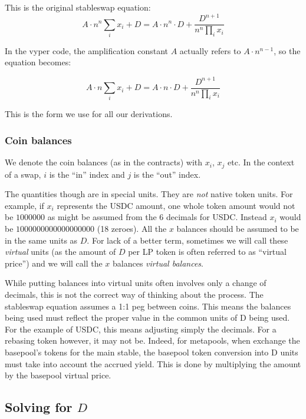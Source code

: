 \documentclass[
]{article}
\begin{document}
This is the original stableswap equation:
\[ A \cdot n^n  \sum_i x_i + D = A \cdot n^n \cdot D + \frac{D^{n+1}}{n^n \prod_i x_i}\]

In the vyper code, the amplification constant \(A\) actually refers to
\(A \cdot n^{n-1}\), so the equation becomes:

\[ A \cdot n  \sum_i x_i + D = A \cdot n \cdot D + \frac{D^{n+1}}{n^n \prod_i x_i}\]

This is the form we use for all our derivations.

\hypertarget{coin-balances}{%
\subsubsection{Coin balances}\label{coin-balances}}

We denote the coin balances (as in the contracts) with \(x_i\), \(x_j\)
etc. In the context of a swap, \(i\) is the ``in'' index and \(j\) is
the ``out'' index.

The quantities though are in special units. They are \emph{not} native
token units. For example, if \(x_i\) represents the USDC amount, one
whole token amount would not be \(1000000\) as might be assumed from the
6 decimals for USDC. Instead \(x_i\) would be \(1000000000000000000\)
(18 zeroes). All the \(x\) balances should be assumed to be in the same
units as \(D\). For lack of a better term, sometimes we will call these
\emph{virtual} units (as the amount of \(D\) per LP token is often
referred to as ``virtual price'') and we will call the \(x\) balances
\emph{virtual balances}.

While putting balances into virtual units often involves only a change
of decimals, this is not the correct way of thinking about the process.
The stableswap equation assumes a 1:1 peg between coins. This means the
balances being used must reflect the proper value in the common units of
D being used. For the example of USDC, this means adjusting simply the
decimals. For a rebasing token however, it may not be. Indeed, for
metapools, when exchange the basepool's tokens for the main stable, the
basepool token conversion into D units must take into account the
accrued yield. This is done by multiplying the amount by the basepool
virtual price.

\hypertarget{solving-for-d}{%
\subsection{\texorpdfstring{Solving for
\(D\)}{Solving for D}}\label{solving-for-d}}
\end{document}
